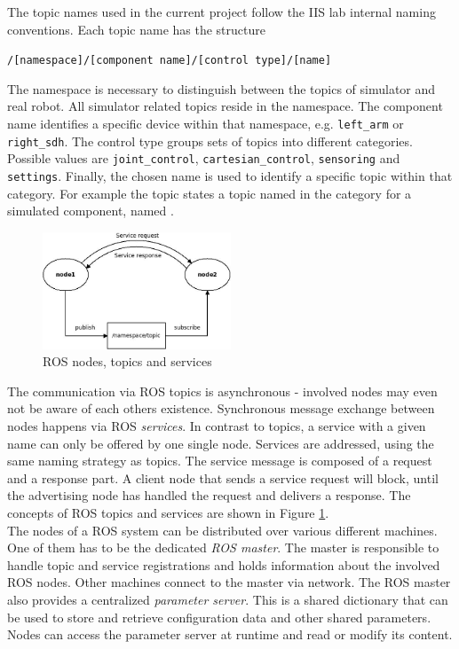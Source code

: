 The topic names used in the current project follow the IIS lab internal naming conventions. Each topic name has the structure
\begin{center}
\texttt{/[namespace]/[component name]/[control type]/[name]}
\end{center}
The namespace is necessary to distinguish between the topics of simulator and real robot. All simulator related topics reside in the  namespace. The component name identifies a specific device within that namespace, e.g. \texttt{left\_arm} or \texttt{right\_sdh}. The control type groups sets of topics into different categories. Possible values are \texttt{joint\_control}, \texttt{cartesian\_control}, \texttt{sensoring} and \texttt{settings}. Finally, the chosen name is used to identify a specific topic within that category. For example the topic  states a topic named  in the category  for a simulated component, named . \\

\begin{figure}[h]
	\centering
  \includegraphics[width=0.5\textwidth]{images/ros_concept.jpg}
	\caption{ROS nodes, topics and services}
	\label{fig:ros_concept}
\end{figure}

The communication via ROS topics is asynchronous - involved nodes may even not be aware of each others existence. Synchronous message exchange between nodes happens via ROS \emph{services}. In contrast to topics, a service with a given name can only be offered by one single node. Services are addressed, using the same naming strategy as topics. The service message is composed of a request and a response part. A client node that sends a service request will block, until the advertising node has handled the request and delivers a response. The concepts of ROS topics and services are shown in Figure \ref{fig:ros_concept}.\\

The nodes of a ROS system can be distributed over various different machines. One of them has to be the dedicated \emph{ROS master}. The master is responsible to handle topic and service registrations and holds information about the involved ROS nodes. Other machines connect to the master via network. The ROS master also provides a centralized \emph{parameter server}. This is a shared dictionary that can be used to store and retrieve configuration data and other shared parameters. Nodes can access the parameter server at runtime and read or modify its content. \\

